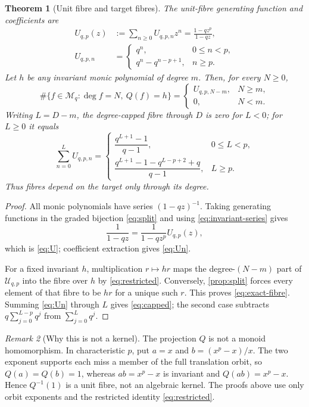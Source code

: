 \documentclass[10pt,a4paper]{amsart}
\newtheorem{theorem}{Theorem}[section]
\theoremstyle{definition}
\theoremstyle{remark}
\newtheorem{remark}[theorem]{Remark}
\newcommand{\Mon}{\mathcal M}
\newcommand{\Res}{\mathcal U}
\begin{document}
\begin{theorem}[Unit fibre and target fibres]\label{thm:fibres}
The unit-fibre generating function and coefficients are
\begin{align}
 U_{q,p}(z)&:=\sum_{n\geq0}U_{q,p,n}z^n
       =\frac{1-qz^p}{1-qz},\label{eq:U}\\
 U_{q,p,n}&=
 \begin{cases}
 q^n,&0\leq n<p,\\
 q^n-q^{n-p+1},&n\geq p.
 \end{cases}\label{eq:Un}
\end{align}
Let $h$ be any invariant monic polynomial of degree $m$.  Then, for every
$N\geq0$,
\begin{equation}\label{eq:exact-fibre}
 \#\{f\in\Mon_q:\deg f=N,\ Q(f)=h\}
 =\begin{cases}U_{q,p,N-m},&N\geq m,\\0,&N<m.\end{cases}
\end{equation}
Writing $L=D-m$, the degree-capped fibre through $D$ is zero for $L<0$;
for $L\geq0$ it equals
\begin{equation}\label{eq:capped}
 \sum_{n=0}^{L}U_{q,p,n}=
 \begin{cases}
 \dfrac{q^{L+1}-1}{q-1},&0\leq L<p,\\[6pt]
 \dfrac{q^{L+1}-1-q^{L-p+2}+q}{q-1},&L\geq p.
 \end{cases}
\end{equation}
Thus fibres depend on the target only through its degree.
\end{theorem}

\begin{proof}
All monic polynomials have series $(1-qz)^{-1}$.  Taking generating
functions in the graded bijection \eqref{eq:split} and using
\eqref{eq:invariant-series} gives
\[
       \frac1{1-qz}=\frac1{1-qz^p}U_{q,p}(z),
\]
which is \eqref{eq:U}; coefficient extraction gives \eqref{eq:Un}.

For a fixed invariant $h$, multiplication $r\mapsto hr$ maps the
degree-$(N-m)$ part of $\Res_{q,p}$ into the fibre over $h$ by
\eqref{eq:restricted}.  Conversely, \cref{prop:split} forces every element
of that fibre to be $hr$ for a unique such $r$.  This proves
\eqref{eq:exact-fibre}.  Summing \eqref{eq:Un} through $L$ gives
\eqref{eq:capped}; the second case subtracts
$q\sum_{j=0}^{L-p}q^j$ from $\sum_{j=0}^{L}q^j$.
\end{proof}

\begin{remark}[Why this is not a kernel]\label{rem:not-kernel}
The projection $Q$ is not a monoid homomorphism.  In characteristic $p$,
put $a=x$ and $b=(x^p-x)/x$.  The two exponent supports each miss a member
of the full translation orbit, so $Q(a)=Q(b)=1$, whereas
$ab=x^p-x$ is invariant and $Q(ab)=x^p-x$.  Hence $Q^{-1}(1)$ is a unit
fibre, not an algebraic kernel.  The proofs above use only orbit exponents
and the restricted identity \eqref{eq:restricted}.
\end{remark}
\end{document}

